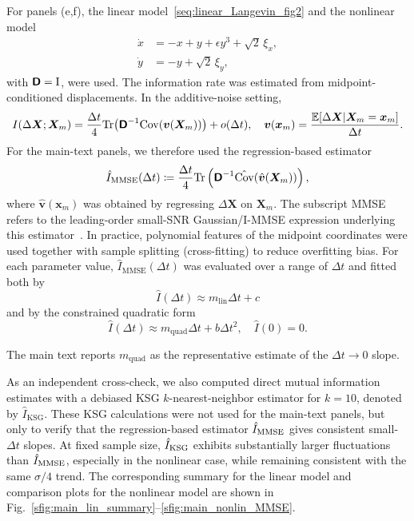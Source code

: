 For panels (e,f), the linear model~\eqref{seq:linear_Langevin_fig2} and the nonlinear model
\begin{equation*}
    \begin{aligned}
        \dot x&=-x+y+\epsilon y^3+\sqrt 2\,\xi_x, \\
        \dot y&=-y+\sqrt 2\,\xi_y,
    \end{aligned}
\end{equation*}
with $\boldsymbol{\mathsf{D}}=\mathrm{I}$, were used. The information rate was estimated from midpoint-conditioned displacements. In the additive-noise setting,
\[
    I(\Delta\bm X;\bm X_m)=\frac{\Delta t}{4}
    \mathrm{Tr}\big(\boldsymbol{\mathsf{D}}^{-1}
    \mathrm{Cov}(\bm v(\bm X_m))\big)+o(\Delta t),
    \quad
    \bm v(\bm x_m)=\frac{\mathbb E[\Delta\bm X|\bm X_m=\bm x_m]}{\Delta t}.
\]
For the main-text panels, we therefore used the regression-based estimator
\begin{equation}
    \hat I_{\mathrm{MMSE}}(\Delta t)\coloneq\frac{\Delta t}{4}
    \mathrm{Tr}\left(\boldsymbol{\mathsf{D}}^{-1}\hat{\mathrm{Cov}}(\hat{\bm v}(\bm X_m))\right),
    \label{seq:I_hat_MMSE}
\end{equation}
where $\hat{\bm v}(\bm x_m)$ was obtained by regressing $\Delta\bm X$ on $\bm X_m$. The subscript MMSE refers to the leading-order small-SNR Gaussian/I-MMSE expression underlying this estimator~\cite{guo2005mutual}. In practice, polynomial features of the midpoint coordinates were used together with sample splitting (cross-fitting) to reduce overfitting bias. For each parameter value, $\hat I_{\mathrm{MMSE}}(\Delta t)$ was evaluated over a range of $\Delta t$ and fitted both by
\begin{equation}
    \hat I(\Delta t)\approx m_{\mathrm{lin}}\Delta t+c
    \label{seq:m_lin}
\end{equation}
and by the constrained quadratic form
\begin{equation}
    \hat I(\Delta t)\approx m_{\mathrm{quad}}\Delta t+b\Delta t^2,
    \quad \hat I(0)=0.
    \label{seq:m_quad}
\end{equation}

The main text reports $m_{\mathrm{quad}}$ as the representative estimate of the $\Delta t\rightarrow0$ slope.

As an independent cross-check, we also computed direct mutual information estimates with a debiased KSG $k$-nearest-neighbor estimator for $k=10$, denoted by $\hat I_{\mathrm{KSG}}$. These KSG calculations were not used for the main-text panels, but only to verify that the regression-based estimator $\hat{I}_{\rm MMSE}$ gives consistent small-$\Delta t$ slopes. At fixed sample size, $\hat{I}_{\rm KSG}$ exhibits substantially larger fluctuations than $\hat{I}_{\rm MMSE}$, especially in the nonlinear case, while remaining consistent with the same $\sigma/4$ trend. The corresponding summary for the linear model and comparison plots for the nonlinear model are shown in Fig.~\ref{sfig:main_lin_summary}--\ref{sfig:main_nonlin_MMSE}.

